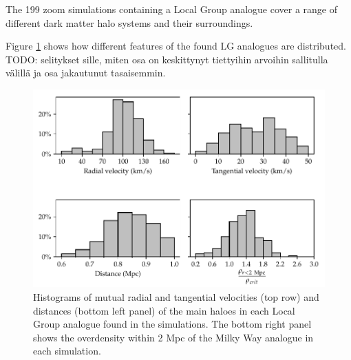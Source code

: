 \documentclass[english, oneside]{HYgradu}
\begin{document}

The 199 zoom simulations containing a Local Group analogue cover a range of different dark matter halo systems and their surroundings. 


Figure \ref{fig:LGproperties} shows how different features of the found LG analogues are distributed. TODO: selitykset sille, miten osa on keskittynyt tiettyihin arvoihin sallitulla välillä ja osa jakautunut tasaisemmin. 

\begin{figure}
    \centering
    \includegraphics{kuvat/LGproperties.pdf}
    \caption{Histograms of mutual radial and tangential velocities (top row) and distances (bottom left panel) of the main haloes in each Local Group analogue found in the simulations. The bottom right panel shows the overdensity within 2 Mpc of the Milky Way analogue in each simulation.}\label{fig:LGproperties}
\end{figure}
\end{document}
